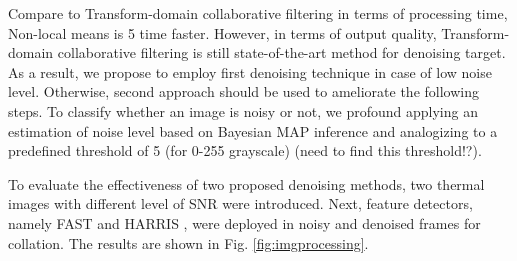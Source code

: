 Compare to Transform-domain collaborative filtering in terms of processing time, Non-local means is 5 time faster. However, in terms of output quality, Transform-domain collaborative filtering is still state-of-the-art method for denoising target. As a result, we propose to employ first denoising technique in case of low noise level. Otherwise, second approach should be used to ameliorate the following steps. To classify whether an image is noisy or not, we profound applying an estimation of noise level based on Bayesian MAP inference \cite{liu2006noise} and analogizing to a predefined threshold of 5 (for 0-255 grayscale) (need to find this threshold!?).

To evaluate the effectiveness of two proposed denoising methods, two thermal images with different level of SNR were introduced. Next, feature detectors, namely FAST \cite{rosten2006machine} and HARRIS \cite{harris1988combined}, were deployed in noisy and denoised frames for collation. The results are shown in Fig. \ref{fig:imgprocessing}.

